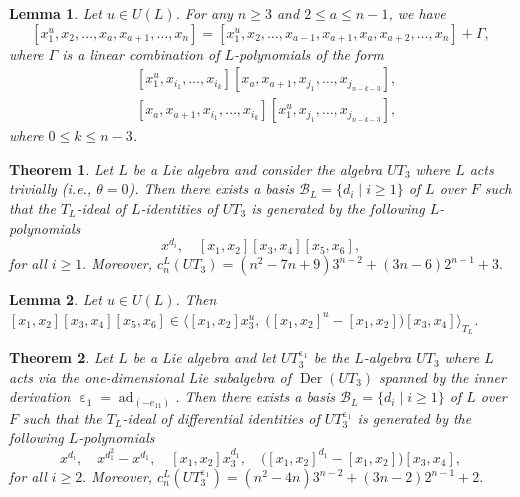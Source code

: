 \documentclass[10pt,a4paper]{amsart}
\newtheorem{lemma}{Lemma}
\newtheorem{theorem}{Theorem}
\DeclareMathOperator{\D}{Der}
\DeclareMathOperator{\ad}{ad}
\newcommand{\black}{\color{black}}
\DeclareMathOperator{\e}{\varepsilon}
\begin{document}
\begin{lemma}\label{lem: ordered comm x_1^u}
    Let $u\in U(L)$. For any $n\geq 3$ and $2\leq a \leq n-1$, we have
$$
[x_1^u,x_2,\ldots, x_a,x_{a+1}, \ldots, x_{n}]= [x_1^u,x_2,\ldots, x_{a-1}, x_{a+1},x_{a}, x_{a+2}, \ldots, x_{n}] + \Gamma,
$$
where $\Gamma$ is a linear combination of $L$-polynomials of the form
\begin{align*}
    &[x_1^u, x_{i_1}, \ldots, x_{i_k}][x_a, x_{a+1}, x_{j_1}, \ldots, x_{j_{n-k-3}}],\\
    &[x_a, x_{a+1}, x_{i_1}, \ldots, x_{i_k}][x_1^u, x_{j_1}, \ldots, x_{j_{n-k-3}}],
\end{align*}
where $0\leq k \leq n-3$.
\end{lemma}

\begin{theorem}\label{Teo: Id^L UT_3 ordinarie}
Let $L$ be a Lie algebra and consider the algebra $UT_3$ where $L$ acts trivially (i.e., $\theta=0$). Then 
there exists a basis $\mathcal{B}_L=\{d_i \mid i \geq 1\}$ of $L$ over $F$ such that 
the $T_L$-ideal of $L$-identities of $UT_3$ is generated by the following $L$-polynomials
$$x^{d_i}, \quad  [x_1,x_2][x_3,x_4][x_5,x_6],$$
for all  $i\geq 1.$ Moreover, $c_n^L(UT_3)=(n^2-7n+9) 3^{n-2}+ (3n-6)2^{n-1}+3.$ 
\end{theorem}

\begin{lemma}\label{lem: conseq 3 commutators 1} 
\black
    Let $u\in U(L)$. Then $[x_1,x_2][x_3,x_4][x_5,x_6]\in \langle [x_1,x_2]x_3^{u},\; \big([x_1,x_2]^{u}-[x_1,x_2]\big)[x_3,x_4] \rangle_{T_L}$.
\end{lemma}

\begin{theorem}\label{Teo: Id^L UT_3 epsilon1}
Let $L$ be a Lie algebra and let $UT_3^{\e_1}$  be  the $L$-algebra $UT_3$ where $L$ acts via the one-dimensional Lie subalgebra of $\D(UT_3)$ spanned by the inner derivation $\e_1=\ad_{(-e_{11})}$. Then 
there exists a basis $\mathcal{B}_L=\{d_i \mid i \geq 1\}$ of $L$ over $F$ such that 
the $T_L$-ideal of differential identities of $UT_3^{\e_1}$ is generated by the following $L$-polynomials
$$
x^{d_i}, \quad  x^{d_1^2}-x^{d_1}, \quad [x_1,x_2]x_3^{d_1}, \quad \big([x_1,x_2]^{d_1}-[x_1,x_2]\big)[x_3,x_4],
$$
for all  $i\geq 2.$ Moreover,
 $c_n^L(UT_3^{\e_1})=(n^2-4n)3^{n-2}+ (3n-2)2^{n-1} +2.$ 
\end{theorem}
\end{document}
